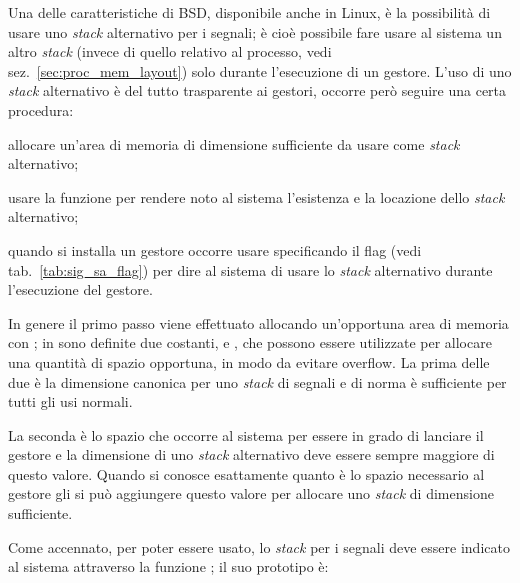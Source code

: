 Una delle caratteristiche di BSD, disponibile anche in Linux, è la possibilità
di usare uno \textit{stack} alternativo per i segnali; è cioè possibile fare
usare al sistema un altro \textit{stack} (invece di quello relativo al
processo, vedi sez.~\ref{sec:proc_mem_layout}) solo durante l'esecuzione di un
gestore.  L'uso di uno \textit{stack} alternativo è del tutto trasparente ai
gestori, occorre però seguire una certa procedura:
\begin{enumerate*}
\item allocare un'area di memoria di dimensione sufficiente da usare come
  \textit{stack} alternativo;
\item usare la funzione  per rendere noto al sistema
  l'esistenza e la locazione dello \textit{stack} alternativo;
\item quando si installa un gestore occorre usare 
  specificando il flag  (vedi tab.~\ref{tab:sig_sa_flag})
  per dire al sistema di usare lo \textit{stack} alternativo durante
  l'esecuzione del gestore.
\end{enumerate*}

In genere il primo passo viene effettuato allocando un'opportuna area di
memoria con ; in  sono definite due costanti,
 e , che possono essere utilizzate per
allocare una quantità di spazio opportuna, in modo da evitare overflow. La
prima delle due è la dimensione canonica per uno \textit{stack} di segnali e
di norma è sufficiente per tutti gli usi normali.

La seconda è lo spazio che occorre al sistema per essere in grado di lanciare
il gestore e la dimensione di uno \textit{stack} alternativo deve essere
sempre maggiore di questo valore. Quando si conosce esattamente quanto è lo
spazio necessario al gestore gli si può aggiungere questo valore per allocare
uno \textit{stack} di dimensione sufficiente.

Come accennato, per poter essere usato, lo \textit{stack} per i segnali deve
essere indicato al sistema attraverso la funzione ; il suo
prototipo è:

